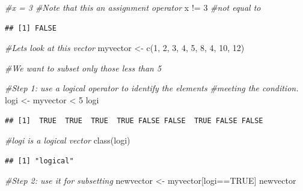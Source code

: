 \documentclass[
]{book}
\newenvironment{Shaded}{\begin{snugshade}}{\end{snugshade}}
\newcommand{\CommentTok}[1]{\textcolor[rgb]{0.56,0.35,0.01}{\textit{#1}}}
\newcommand{\ConstantTok}[1]{\textcolor[rgb]{0.00,0.00,0.00}{#1}}
\newcommand{\DecValTok}[1]{\textcolor[rgb]{0.00,0.00,0.81}{#1}}
\newcommand{\FunctionTok}[1]{\textcolor[rgb]{0.00,0.00,0.00}{#1}}
\newcommand{\NormalTok}[1]{#1}
\newcommand{\OtherTok}[1]{\textcolor[rgb]{0.56,0.35,0.01}{#1}}
\newcommand{\SpecialCharTok}[1]{\textcolor[rgb]{0.00,0.00,0.00}{#1}}
\theoremstyle{definition}
\theoremstyle{definition}
\theoremstyle{definition}
\theoremstyle{definition}
\theoremstyle{remark}
\begin{document}
\begin{Shaded}
\begin{Highlighting}[]
\CommentTok{\#x = 3     \#Note that this an assignment operator}
\NormalTok{x }\SpecialCharTok{!=} \DecValTok{3}     \CommentTok{\#not equal to}
\end{Highlighting}
\end{Shaded}

\begin{verbatim}
## [1] FALSE
\end{verbatim}

\begin{Shaded}
\begin{Highlighting}[]
\CommentTok{\#Let\textquotesingle{}s look at this vector}
\NormalTok{myvector }\OtherTok{\textless{}{-}} \FunctionTok{c}\NormalTok{(}\DecValTok{1}\NormalTok{, }\DecValTok{2}\NormalTok{, }\DecValTok{3}\NormalTok{, }\DecValTok{4}\NormalTok{, }\DecValTok{5}\NormalTok{, }\DecValTok{8}\NormalTok{, }\DecValTok{4}\NormalTok{, }\DecValTok{10}\NormalTok{, }\DecValTok{12}\NormalTok{)}

\CommentTok{\#We want to subset only those less than 5}

\CommentTok{\#Step 1: use a logical operator to identify the elements}
\CommentTok{\#meeting the condition.}
\NormalTok{logi }\OtherTok{\textless{}{-}}\NormalTok{ myvector }\SpecialCharTok{\textless{}} \DecValTok{5} 
\NormalTok{logi}
\end{Highlighting}
\end{Shaded}

\begin{verbatim}
## [1]  TRUE  TRUE  TRUE  TRUE FALSE FALSE  TRUE FALSE FALSE
\end{verbatim}

\begin{Shaded}
\begin{Highlighting}[]
\CommentTok{\#logi is a logical vector}
\FunctionTok{class}\NormalTok{(logi)}
\end{Highlighting}
\end{Shaded}

\begin{verbatim}
## [1] "logical"
\end{verbatim}

\begin{Shaded}
\begin{Highlighting}[]
\CommentTok{\#Step 2: use it for subsetting}
\NormalTok{newvector }\OtherTok{\textless{}{-}}\NormalTok{ myvector[logi}\SpecialCharTok{==}\ConstantTok{TRUE}\NormalTok{]}
\NormalTok{newvector}
\end{Highlighting}
\end{Shaded}
\end{document}
